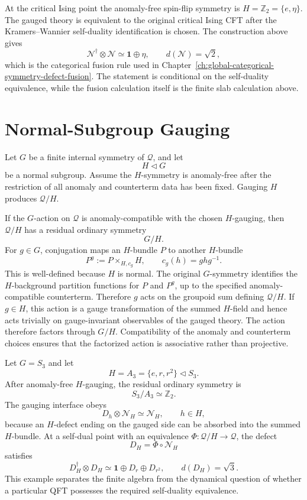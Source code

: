 \begin{example}
\label{ex:ising-kw-as-self-dual-gauging}
At the critical Ising point the anomaly-free spin-flip symmetry is
\(H=\mathbb Z_2=\{e,\eta\}\).  The gauged theory is equivalent to the original
critical Ising CFT after the Kramers--Wannier self-duality identification is
chosen.  The construction above gives
\[
  \mathcal N^\dagger\otimes\mathcal N
  \simeq
  \mathbf 1\oplus\eta,
  \qquad
  d(\mathcal N)=\sqrt2,
\]
which is the categorical fusion rule used in
Chapter~\ref{ch:global-categorical-symmetry-defect-fusion}.  The statement is
conditional on the self-duality equivalence, while the fusion calculation
itself is the finite slab calculation above.
\end{example}

\section{Normal-Subgroup Gauging}

Let \(G\) be a finite internal symmetry of \(\mathcal Q\), and let
\[
  H\triangleleft G
\]
be a normal subgroup.  Assume the \(H\)-symmetry is anomaly-free after the
restriction of all anomaly and counterterm data has been fixed.  Gauging \(H\)
produces \(\mathcal Q/H\).

If the \(G\)-action on \(\mathcal Q\) is anomaly-compatible with the chosen
\(H\)-gauging, then \(\mathcal Q/H\) has a residual ordinary symmetry
\[
  G/H .
\]
For \(g\in G\), conjugation maps an \(H\)-bundle \(P\) to another \(H\)-bundle
\[
  P^g:=P\times_{H,c_g}H,
  \qquad c_g(h)=ghg^{-1}.
\]
This is well-defined because \(H\) is normal.  The original \(G\)-symmetry
identifies the \(H\)-background partition functions for \(P\) and \(P^g\),
up to the specified anomaly-compatible counterterm.  Therefore \(g\) acts on
the groupoid sum defining \(\mathcal Q/H\).  If \(g\in H\), this action is a
gauge transformation of the summed \(H\)-field and hence acts trivially on
gauge-invariant observables of the gauged theory.  The action therefore
factors through \(G/H\).  Compatibility of the anomaly and counterterm choices
ensures that the factorized action is associative rather than projective.

\begin{example}
\label{ex:normal-subgroup-gauging-defect}
Let \(G=S_3\) and let
\[
  H=A_3=\{e,r,r^2\}\triangleleft S_3.
\]
After anomaly-free \(H\)-gauging, the residual ordinary symmetry is
\[
  S_3/A_3\simeq\mathbb Z_2.
\]
The gauging interface obeys
\[
  D_h\otimes\mathcal N_H\simeq\mathcal N_H,
  \qquad h\in H,
\]
because an \(H\)-defect ending on the gauged side can be absorbed into the
summed \(H\)-bundle.  At a self-dual point with an equivalence
\(\Phi:\mathcal Q/H\to\mathcal Q\), the defect
\[
  D_H=\Phi\circ\mathcal N_H
\]
satisfies
\[
  D_H^\dagger\otimes D_H
  \simeq
  \mathbf 1\oplus D_r\oplus D_{r^2},
  \qquad
  d(D_H)=\sqrt3 .
\]
This example separates the finite algebra from the dynamical question of
whether a particular QFT possesses the required self-duality equivalence.
\end{example}

